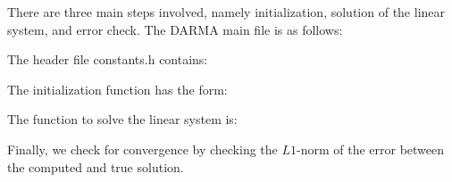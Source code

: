 There are three main steps involved, namely initialization, 
solution of the linear system, and error check. 
The DARMA main file is as follows:


The header file constants.h contains:


The initialization function has the form:


The function to solve the linear system is:


Finally, we check for convergence by checking the $L1$-norm of the 
error between the computed and true solution.









